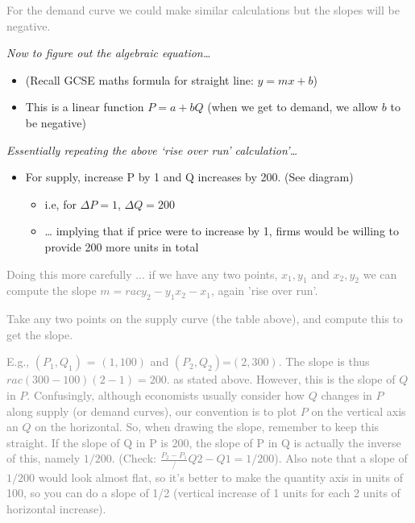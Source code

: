 \documentclass[]{article}
\providecommand{\tightlist}{%
  \setlength{\itemsep}{0pt}\setlength{\parskip}{0pt}}
\begin{document}
\textcolor{gray}{For the demand curve we could make similar calculations but the slopes will be negative.}

\emph{Now to figure out the algebraic equation\ldots{}}

\begin{itemize}
\item
  (Recall GCSE maths formula for straight line: \(y=mx+b\))
\item
  This is a linear function \(P = a+bQ\) (when we get to demand, we
  allow \(b\) to be negative)
\end{itemize}

\emph{Essentially repeating the above `rise over run'
calculation'\ldots{}}

\begin{itemize}
\tightlist
\item
  For supply, increase P by 1 and Q increases by 200. (See diagram)

  \begin{itemize}
  \tightlist
  \item
    i.e, for \(\Delta P = 1\), \(\Delta Q = 200\)
  \item
    \ldots{} implying that if price were to increase by 1, firms would
    be willing to provide 200 more units in total
  \end{itemize}
\end{itemize}

\textcolor{gray}{Doing this more carefully ... if we have any two points, $x_1,y_1$ and $x_2,y_2$ we can compute the slope $m= rac{y_2-y_1}{x_2-x_1}$, again 'rise over run'.}

\textcolor{gray}{Take any two points on the supply curve (the table above), and compute this to get the slope.}

\textcolor{gray}{E.g., $(P_1,Q_1)$ = $(1,100)$ and $(P_2,Q_2)$=$(2,300)$.  The slope is thus $rac{(300-100)}{(2-1)}=200.$ as stated above. However, this is the slope of $Q$ in $P$. Confusingly, although economists usually consider how $Q$ changes in $P$ along supply (or demand curves), our convention is to plot $P$ on the vertical axis an $Q$ on the horizontal. So, when drawing the slope, remember to keep this straight. If the slope of Q in P is 200, the slope of P in Q is actually the inverse of this, namely $1/200$. (Check: $\frac{P_2-P_1}/{Q2-Q1}=1/200$). Also note that a slope of $1/200$ would look almost flat, so it's better to make the quantity axis in units of 100, so you can do a slope of 1/2 (vertical increase of 1 units for each 2 units of horizontal increase).}
\end{document}
